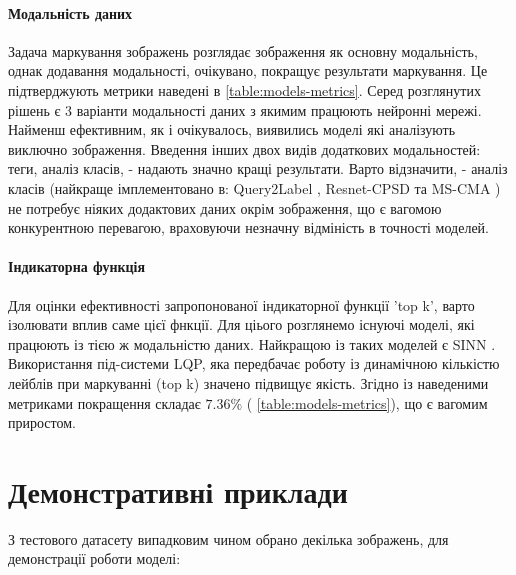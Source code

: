 \documentclass{udstu}
\begin{document}
\paragraph{\textbf{Модальність даних}}
Задача маркування зображень розглядає зображення як основну модальність, однак додавання модальності,
очікувано, покращує результати маркування. Це підтверджують метрики наведені в \tablename{ \ref{table:models-metrics}}.
Серед розглянутих рішень є 3 варіанти модальності даних з якимим працюють нейронні мережі.
Найменш ефективним, як і очікувалось, виявились моделі які аналізують виключно зображення.
Введення інших двох видів додаткових модальностей: теги, аналіз класів, - надають значно кращі результати.
Варто відзначити, - аналіз класів (найкраще імплементовано в: Query2Label \cite{q2l}, Resnet-CPSD
\cite{cpsd} та MS-CMA \cite{cma}) не потребує ніяких додактових даних окрім зображення,
що є вагомою конкурентною перевагою, враховуючи незначну відміність в точності моделей.

\paragraph{\textbf{Індикаторна функція}}
Для оцінки ефективності запропонованої індикаторної функції 'top k', варто ізолювати вплив саме цієї фнкції.
Для ціього розглянемо існуючі моделі, які працюють із тією ж модальністю даних. Найкращою із таких моделей є
SINN \cite{cnn-sinn}. Використання під-системи LQP, яка передбачає роботу із динамічною кількістю лейблів при маркуванні
(top k) значено підвищує якість. Згідно із наведеними метриками покращення складає
$7.36\%$ (\tablename{ \ref{table:models-metrics}}), що є вагомим приростом.


\clearpage

\section{Демонстративні приклади}

З тестового датасету випадковим чином обрано декілька зображень, для демонстрації роботи моделі:
\end{document}
